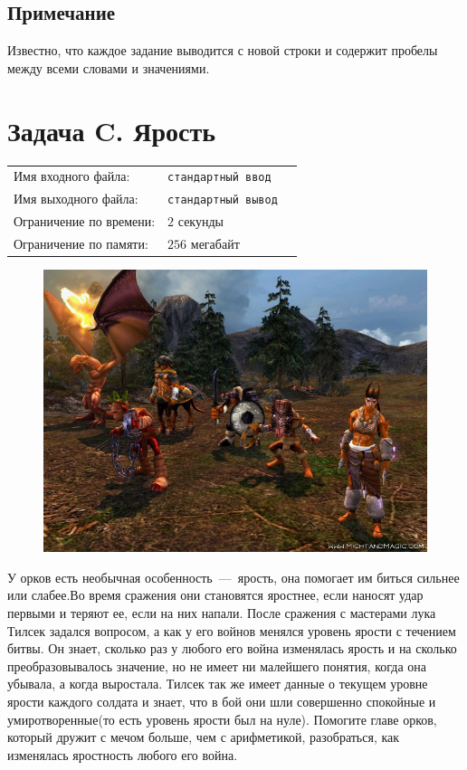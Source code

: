 \documentclass[12pt]{scrartcl}
\newcommand{\inputFile}{стандартный ввод}
\newcommand{\outputFile}{стандартный вывод}
\begin{document}
\subsection*{Примечание}
Известно, что каждое задание выводится с новой строки и содержит пробелы между всеми словами и значениями.



\newpage
\section*{Задача C. Ярость}

\begin{tabularx}{\textwidth}{l l X}
    Имя входного файла: & \texttt{\inputFile} \\
    Имя выходного файла: & \texttt{\outputFile} \\
    Ограничение по времени: & $2$ секунды \\
    Ограничение по памяти: & $256$ мегабайт \\
\end{tabularx}

\begin{figure}[h]
	\centering
  \includegraphics[width=0.6\linewidth]{orks}
 \end{figure}

У орков есть необычная особенность~---~ярость, она помогает им биться сильнее или слабее.Во время сражения они становятся яростнее, если наносят удар первыми и теряют ее, если на них напали. После сражения с мастерами лука Тилсек задался вопросом, а как у его войнов менялся уровень ярости с течением битвы. Он знает, сколько раз у любого его война изменялась ярость и на сколько преобразовывалось значение, но не имеет ни малейшего понятия, когда она убывала, а когда выростала. Тилсек так же имеет данные о текущем уровне ярости каждого солдата и знает, что в бой они шли совершенно спокойные и умиротворенные(то есть уровень ярости был на нуле). Помогите главе орков, который дружит с мечом больше, чем с арифметикой, разобраться, как изменялась яростность любого его война.
\end{document}
